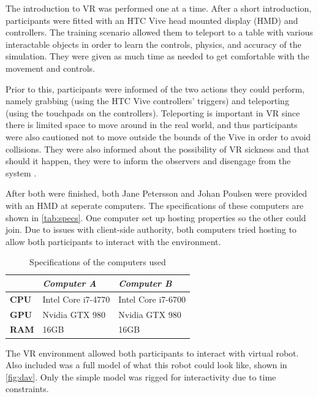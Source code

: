 \documentclass[conference]{IEEEtran}
\begin{document}
The introduction to VR was performed one at a time. After a short introduction, participants were fitted with an HTC Vive head mounted display (HMD) and controllers. The training scenario allowed them to teleport to a table with various interactable objects in order to learn the controls, physics, and accuracy of the simulation. They were given as much time as needed to get comfortable with the movement and controls.

Prior to this, participants were informed of the two actions they could perform, namely grabbing (using the HTC Vive controllers' triggers) and teleporting (using the touchpads on the controllers). Teleporting is important in VR since there is limited space to move around in the real world, and thus participants were also cautioned not to move outside the bounds of the Vive in order to avoid collisions. They were also informed about the possibility of VR sickness and that should it happen, they were to inform the observers and disengage from the system \citep{barrett_side_2004}.

After both were finished, both Jane Petersson and Johan Poulsen were provided with an HMD at seperate computers. The specifications of these computers are shown in \autoref{tab:specs}. One computer set up hosting properties so the other could join. Due to issues with client-side authority, both computers tried hosting to allow both participants to interact with the environment.

\begin{table}
\centering
\begin{tabularx}{0.48\textwidth}{X X X}
\toprule
                     & \textit{Computer A} & \textit{Computer B} \\ \midrule \rowcolor{lightGrey}
\textbf{CPU}         & Intel Core i7-4770  & Intel Core i7-6700  \\

\textbf{GPU}         & Nvidia GTX 980      & Nvidia GTX 980    \\  \rowcolor{lightGrey}

\textbf{RAM} 		 & 16GB                & 16GB                 \\ \toprule
\end{tabularx}
\caption{Specifications of the computers used}
\label{tab:specs}
\end{table}

The VR environment allowed both participants to interact with virtual robot. Also included was a full model of what this robot could look like, shown in \autoref{fig:dav}. Only the simple model was rigged for interactivity due to time constraints.
\end{document}
